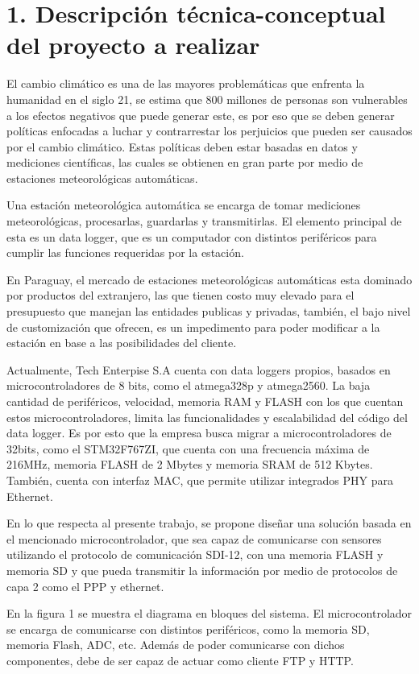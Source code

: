 \documentclass[
11pt, %
codirector, %
]{charter}
\begin{document}
\section{1. Descripción técnica-conceptual del proyecto a realizar}
\label{sec:descripcion}

El cambio climático es una de las mayores problemáticas que enfrenta la humanidad en el siglo 21, se estima que 800 millones de personas son vulnerables a los efectos negativos que puede generar este, es por eso que se deben generar políticas enfocadas a luchar y contrarrestar los perjuicios que pueden ser causados por el cambio climático. Estas políticas deben estar basadas en datos y mediciones científicas, las cuales se obtienen en gran parte por medio de estaciones meteorológicas automáticas.   

Una estación meteorológica automática se encarga de tomar mediciones meteorológicas, procesarlas, guardarlas y transmitirlas. El elemento principal de esta es un data logger, que es un computador con distintos periféricos para cumplir las funciones requeridas por la estación. 

En Paraguay, el mercado de estaciones meteorológicas automáticas esta dominado por productos del extranjero, las que tienen costo muy elevado para el presupuesto que manejan las entidades publicas y privadas, también, el bajo nivel de customización que ofrecen, es un impedimento para poder modificar a la estación en base a las posibilidades del cliente.

Actualmente, Tech Enterpise S.A cuenta con data loggers propios, basados en microcontroladores de 8 bits, como el atmega328p y atmega2560. La baja cantidad de periféricos, velocidad, memoria RAM y FLASH con los que cuentan estos microcontroladores, limita las funcionalidades y escalabilidad del código del data logger. Es por esto que la empresa busca migrar a microcontroladores de 32bits, como el STM32F767ZI, que cuenta con una frecuencia máxima de 216MHz, memoria FLASH de 2 Mbytes y memoria SRAM de 512 Kbytes. También, cuenta con interfaz MAC, que permite utilizar integrados PHY para Ethernet.   

En lo que respecta al presente trabajo, se propone diseñar una solución basada en el mencionado microcontrolador, que sea capaz de comunicarse con sensores utilizando el protocolo de comunicación SDI-12, con una memoria FLASH y memoria SD y que pueda transmitir la información por medio de protocolos de capa 2 como el PPP y ethernet.

En la figura 1 se muestra el diagrama en bloques del sistema. El microcontrolador se encarga de comunicarse con distintos periféricos, como la memoria SD, memoria Flash, ADC, etc. Además de poder comunicarse con dichos componentes, debe de ser capaz de actuar como cliente FTP y HTTP.
\end{document}

